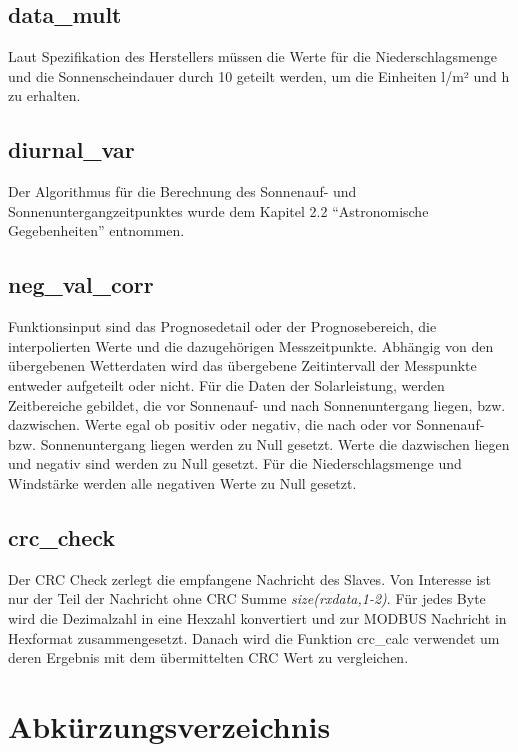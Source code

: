 \section{data\_mult}\label{sec:datamult}
Laut Spezifikation des Herstellers\cite[S. 19-20]{HKWDoc} müssen die Werte für die Niederschlagsmenge und die Sonnenscheindauer durch 10 geteilt werden, um die Einheiten l/m² und h zu erhalten.

\section{diurnal\_var}\label{sec:diurnalvar}
Der Algorithmus für die Berechnung des Sonnenauf- und Sonnenuntergangzeitpunktes wurde dem Kapitel 2.2 \enquote{Astronomische Gegebenheiten} entnommen. \cite{Wagner.2006}

\section{neg\_val\_corr}\label{sec:negvalcorr}
Funktionsinput sind das Prognosedetail oder der Prognosebereich, die interpolierten Werte und die dazugehörigen Messzeitpunkte. Abhängig von den übergebenen Wetterdaten wird das übergebene Zeitintervall der Messpunkte entweder aufgeteilt oder nicht. Für die Daten der Solarleistung, werden Zeitbereiche gebildet, die vor Sonnenauf- und nach Sonnenuntergang liegen, bzw. dazwischen. Werte egal ob positiv oder negativ, die nach oder vor Sonnenauf- bzw. Sonnenuntergang liegen werden zu Null gesetzt. Werte die dazwischen liegen und negativ sind werden zu Null gesetzt. Für die Niederschlagsmenge und Windstärke werden alle negativen Werte zu Null gesetzt.

\section{crc\_check}\label{sec:crccheck}
Der CRC Check zerlegt die empfangene Nachricht des Slaves. Von Interesse ist nur der Teil der Nachricht ohne CRC Summe \textit{size(rxdata,1-2)}. Für jedes Byte wird die Dezimalzahl in eine Hexzahl konvertiert und zur MODBUS Nachricht in Hexformat zusammengesetzt. Danach wird die Funktion \textsf{crc\_calc} verwendet um deren Ergebnis mit dem übermittelten CRC Wert zu vergleichen.

\chapter{Abkürzungsverzeichnis}

